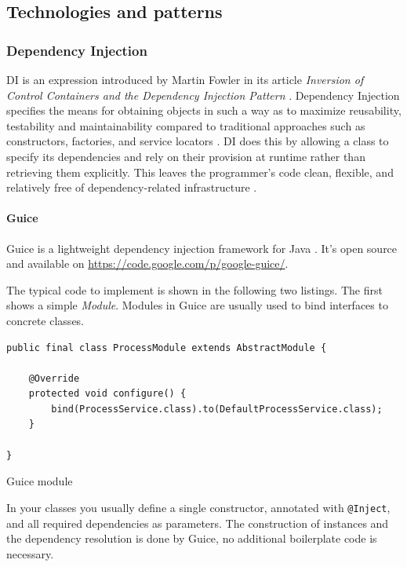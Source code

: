 \newpage
\subsection{Technologies and patterns}

\subsubsection{Dependency Injection}
\gls{DI} is an expression introduced by Martin Fowler in its article \textit{Inversion of Control Containers and the Dependency Injection Pattern} \cite{Fowler:2004}. Dependency Injection specifies the means for obtaining objects in such a way as to maximize reusability, testability and maintainability compared to traditional approaches such as constructors, factories, and service locators \cite{JSR330}. \gls{DI} does this by allowing a class to specify its dependencies and rely on their provision at runtime rather than retrieving them explicitly. This leaves the programmer's code clean, flexible, and relatively free of dependency-related infrastructure \cite{JSR330}.

\paragraph{Guice}
Guice is a lightweight dependency injection framework for Java \cite{Guice}. It's open source and available on \url{https://code.google.com/p/google-guice/}.

The typical code to implement is shown in the following two listings. The first shows a simple \textit{Module}. Modules in Guice are usually used to bind interfaces to concrete classes.

\begin{listing}[H]
\begin{verbatim}
public final class ProcessModule extends AbstractModule {

    @Override 
    protected void configure() {
        bind(ProcessService.class).to(DefaultProcessService.class);
    }

}
\end{verbatim}
\caption{Guice module}
\end{listing}

In your classes you usually define a single constructor, annotated with \texttt{@Inject}, and all required dependencies as parameters. The construction of instances and the dependency resolution is done by Guice, no additional boilerplate code is necessary.

